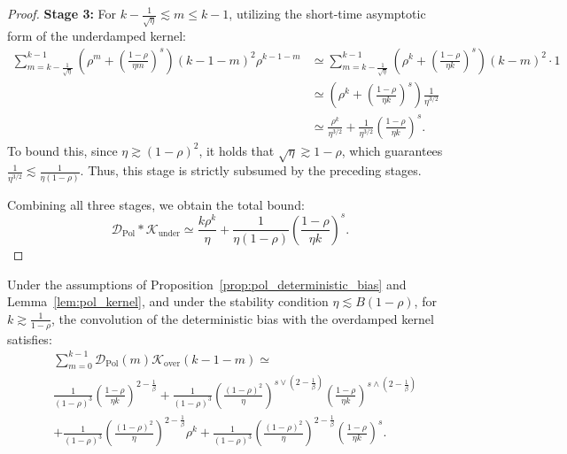 \begin{proof}
\textbf{Stage 3:} For $k - \frac{1}{\sqrt{\eta}} \lesssim m \le k-1$, utilizing the short-time asymptotic form of the underdamped kernel:
\begin{align*}
    \sum_{m=k-\frac{1}{\sqrt{\eta}}}^{k-1} \left(\rho^m + \left(\frac{1-\rho}{\eta m}\right)^s\right) (k-1-m)^2 \rho^{k-1-m}
    &\simeq \sum_{m=k-\frac{1}{\sqrt{\eta}}}^{k-1} \left(\rho^k + \left(\frac{1-\rho}{\eta k}\right)^s\right) (k-m)^2 \cdot 1 \\
    &\simeq \left(\rho^k + \left(\frac{1-\rho}{\eta k}\right)^s\right) \frac{1}{\eta^{3/2}} \\
    &\simeq \frac{\rho^k}{\eta^{3/2}} + \frac{1}{\eta^{3/2}} \left(\frac{1-\rho}{\eta k}\right)^s.
\end{align*}
To bound this, since $\eta \gtrsim (1-\rho)^2$, it holds that $\sqrt{\eta} \gtrsim 1-\rho$, which guarantees $\frac{1}{\eta^{3/2}} \lesssim \frac{1}{\eta(1-\rho)}$. Thus, this stage is strictly subsumed by the preceding stages.

Combining all three stages, we obtain the total bound:
\begin{equation*}
    \mathcal{D}_{\mathrm{Pol}} * \mathcal{K}_{\mathrm{under}} \simeq \frac{k\rho^k}{\eta} + \frac{1}{\eta(1-\rho)} \left(\frac{1-\rho}{\eta k}\right)^s.
\end{equation*}
\end{proof}


\begin{lemma}
\label{lem:conv_over}
Under the assumptions of Proposition~\ref{prop:pol_deterministic_bias} and Lemma~\ref{lem:pol_kernel}, and under the stability condition
$\eta\lesssim B(1-\rho)$, for $k\gtrsim \frac{1}{1-\rho}$, the convolution of the deterministic bias with the overdamped kernel satisfies:
\begin{align*}
    &\sum_{m=0}^{k-1} \mathcal{D}_{\mathrm{Pol}}(m) \mathcal{K}_{\mathrm{over}}(k-1-m) \simeq\quad\\ 
    &\frac{1}{(1-\rho)^3} \left(\frac{1-\rho}{\eta k}\right)^{2-\frac{1}{\beta}} 
    + \frac{1}{(1-\rho)^3} \left(\frac{(1-\rho)^2}{\eta}\right)^{s \vee (2-\frac{1}{\beta})} \left(\frac{1-\rho}{\eta k}\right)^{s \wedge (2-\frac{1}{\beta})} \\
    &+ \frac{1}{(1-\rho)^3} \left(\frac{(1-\rho)^2}{\eta}\right)^{2-\frac{1}{\beta}} \rho^k 
    + \frac{1}{(1-\rho)^3} \left(\frac{(1-\rho)^2}{\eta}\right)^{2-\frac{1}{\beta}} \left(\frac{1-\rho}{\eta k}\right)^s .
\end{align*}


\end{lemma}


